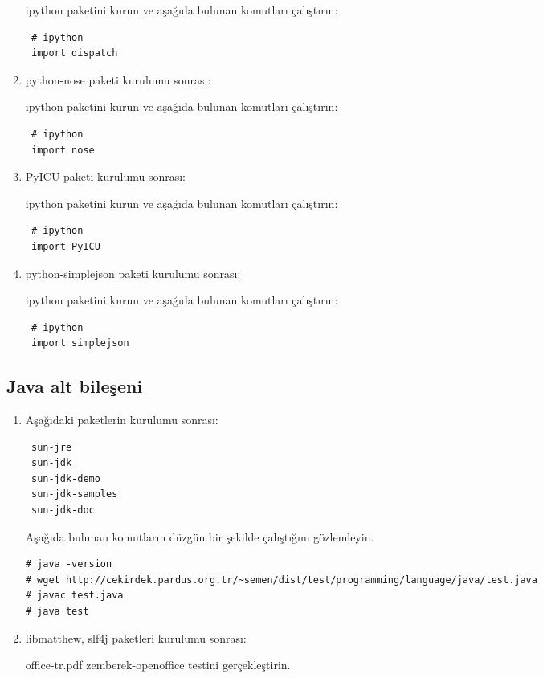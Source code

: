 \documentclass[a4paper,10pt]{article}
\begin{document}
\begin{enumerate}
ipython paketini kurun ve aşağıda bulunan komutları çalıştırın:
\begin{verbatim}
 # ipython
 import dispatch
\end{verbatim}

\item python-nose paketi kurulumu sonrası:  

ipython paketini kurun ve aşağıda bulunan komutları çalıştırın:
\begin{verbatim}
 # ipython
 import nose
\end{verbatim}

\item PyICU paketi kurulumu sonrası:  

ipython paketini kurun ve aşağıda bulunan komutları çalıştırın:
\begin{verbatim}
 # ipython
 import PyICU
\end{verbatim}

\item python-simplejson paketi kurulumu sonrası:  

ipython paketini kurun ve aşağıda bulunan komutları çalıştırın:
\begin{verbatim}
 # ipython
 import simplejson
\end{verbatim}

\end{enumerate}

\subsection{Java alt bileşeni}
\begin{enumerate}
 \item Aşağıdaki paketlerin kurulumu sonrası:
\begin{verbatim}
 sun-jre
 sun-jdk
 sun-jdk-demo
 sun-jdk-samples
 sun-jdk-doc
\end{verbatim}

Aşağıda bulunan komutların düzgün bir şekilde çalıştığını gözlemleyin.
\begin{verbatim}
# java -version
# wget http://cekirdek.pardus.org.tr/~semen/dist/test/programming/language/java/test.java
# javac test.java
# java test
\end{verbatim}

\item libmatthew, slf4j paketleri kurulumu sonrası:

office-tr.pdf zemberek-openoffice testini gerçekleştirin.
\end{enumerate}
\end{document}
